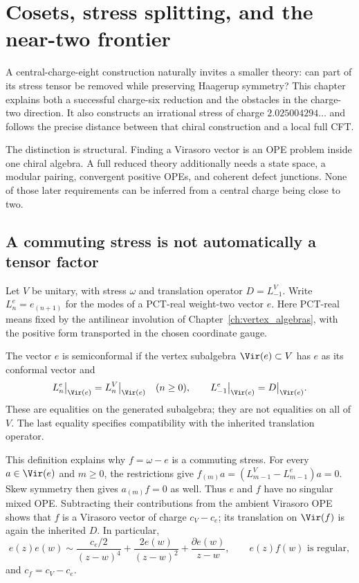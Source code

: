 \chapter{Cosets, stress splitting, and the near-two frontier}
\label{ch:cosets}

A central-charge-eight construction naturally invites a smaller theory:
can part of its stress tensor be removed while preserving Haagerup
symmetry? This chapter explains both a successful charge-six reduction
and the obstacles in the charge-two direction. It also constructs an
irrational stress of charge $2.025004294\ldots$ and follows the precise
distance between that chiral construction and a local full CFT.

The distinction is structural. Finding a Virasoro vector is an OPE
problem inside one chiral algebra. A full reduced theory additionally
needs a state space, a modular pairing, convergent positive OPEs, and
coherent defect junctions. None of those later requirements can be
inferred from a central charge being close to two.

\section{A commuting stress is not automatically a tensor factor}

Let $V$ be unitary, with stress $\omega$ and translation operator
$D=L^V_{-1}$. Write $L^e_n=e_{(n+1)}$ for the modes of a
PCT-real weight-two vector $e$. Here PCT-real means fixed by the
antilinear involution of Chapter~\ref{ch:vertex_algebras}, with the
positive form transported in the chosen coordinate gauge.
\begin{definition}
The vector $e$ is semiconformal if the vertex subalgebra
$\Vir(e)\subset V$ has $e$ as its conformal vector and
\[
 L^e_n\big|_{\Vir(e)}=L^V_n\big|_{\Vir(e)}\quad(n\geq0),
 \qquad L^e_{-1}\big|_{\Vir(e)}=D\big|_{\Vir(e)}.
\]
These are equalities on the generated subalgebra; they are not
equalities on all of $V$. The last equality specifies compatibility
with the inherited translation operator.
\end{definition}

This definition explains why $f=\omega-e$ is a commuting stress.
For every $a\in\Vir(e)$ and $m\geq0$, the restrictions give
$f_{(m)}a=(L^V_{m-1}-L^e_{m-1})a=0$. Skew symmetry then gives
$a_{(m)}f=0$ as well. Thus $e$ and $f$ have no singular mixed OPE.
Subtracting their contributions from the ambient Virasoro OPE shows
that $f$ is a Virasoro vector of charge $c_V-c_e$; its translation
on $\Vir(f)$ is again the inherited $D$. In particular,
\[
 e(z)e(w)\sim\frac{c_e/2}{(z-w)^4}
       +\frac{2e(w)}{(z-w)^2}+\frac{\partial e(w)}{z-w},
 \qquad e(z)f(w)\text{ is regular},
\]
and $c_f=c_V-c_e$.

